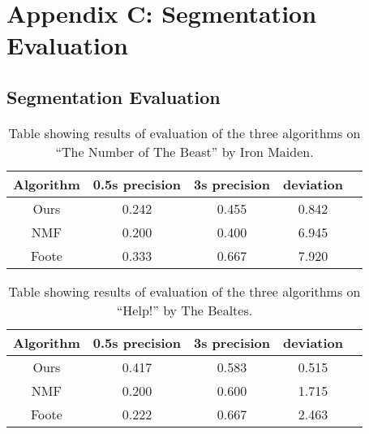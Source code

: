 
\chapter{Appendix C: Segmentation Evaluation } %

\label{AppendixC} %


\section{Segmentation Evaluation}
\label{sec:segevalapp}

\begin{table}
\begin{center}
\begin{tabular}{| c | c | c | c | c |} \hline 
Algorithm  &   0.5s precision   	&  3s precision 		&   deviation   	\\ \hline \hline
Ours			& 	0.242				&  0.455				& 	0.842		\\ \hline
NMF			&  0.200				&  0.400				&	6.945		\\ \hline
Foote		&  0.333				&  0.667				& 	7.920		\\ \hline
\end{tabular}
\caption{Table showing results of evaluation of the three algorithms on ``The Number of The Beast'' by Iron Maiden.}
\label{table:evalnumberbeast}
\end{center}
\end{table}

\begin{table}
\begin{center}
\begin{tabular}{| c | c | c | c | c |} \hline 
Algorithm  &   0.5s precision   	&  3s precision 	&   deviation   	\\ \hline \hline
Ours			& 	0.417				&  0.583			& 	0.515		\\ \hline
NMF			&  0.200				&  0.600			&	1.715		\\ \hline
Foote		&  0.222				&  0.667			& 	2.463		\\ \hline
\end{tabular}
\caption{Table showing results of evaluation of the three algorithms on ``Help!'' by The Bealtes.}
\label{table:evalhelp}
\end{center}
\end{table}

